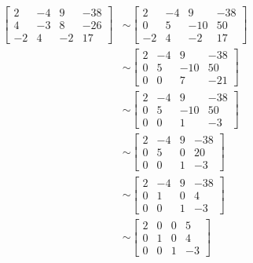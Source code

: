 \documentclass[11pt, a4paper, norsk]{NTNUoving}
\begin{document}
\begin{oppgave}
    \begin{punkt}
        \begin{align*}
        \begin{bmatrix} %
            2 & -4 & 9 & -38\\
            4 & -3 & 8 & -26\\
            -2 & 4 & -2 & 17
        \end{bmatrix}
            &\sim
        \begin{bmatrix} %
            2 & -4 & 9 & -38\\
            0 & 5 & -10 & 50\\
            -2 & 4 & -2 & 17
        \end{bmatrix}
            \\&\sim
        \begin{bmatrix} %
            2 & -4 & 9 & -38\\
            0 & 5 & -10 & 50\\
            0 & 0 & 7 & -21
        \end{bmatrix}
            \\&\sim
        \begin{bmatrix} %
            2 & -4 & 9 & -38\\
            0 & 5 & -10 & 50\\
            0 & 0 & 1 & -3
        \end{bmatrix}
            \\&\sim
        \begin{bmatrix} %
            2 & -4 & 9 & -38\\
            0 & 5 & 0 & 20\\
            0 & 0 & 1 & -3
        \end{bmatrix}
            \\&\sim
        \begin{bmatrix} %
            2 & -4 & 9 & -38\\
            0 & 1 & 0 & 4\\
            0 & 0 & 1 & -3
        \end{bmatrix}
            \\&\sim
        \begin{bmatrix} %
            2 & 0 & 0 & 5\\
            0 & 1 & 0 & 4\\
            0 & 0 & 1 & -3
        \end{bmatrix}

\end{align*}
\end{punkt}
\end{oppgave}
\end{document}
